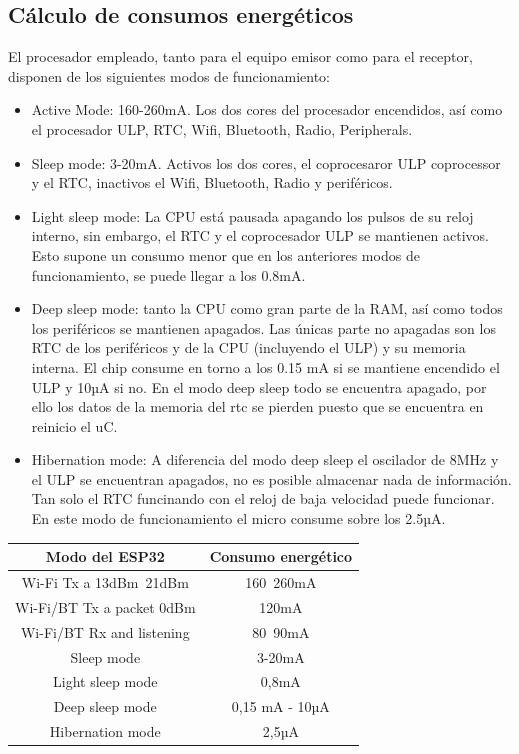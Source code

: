 \documentclass[paper=a4, fontsize=11pt,twoside]{scrartcl}	%
\begin{document}
    \subsection{Cálculo de consumos energéticos}
            El procesador empleado, tanto para el equipo emisor como para el receptor, disponen de los siguientes modos de funcionamiento:
            \begin{itemize}
                \item  Active Mode: 160-260mA. Los dos cores del procesador encendidos, así como el procesador ULP,
                RTC, Wifi, Bluetooth, Radio, Peripherals.
                \item  Sleep mode: 3-20mA. Activos los dos cores, el coprocesaror ULP coprocessor y el RTC, inactivos el 
                Wifi, Bluetooth, Radio y periféricos.
                \item  Light sleep mode: La CPU está pausada apagando los pulsos de su reloj interno, sin embargo, el RTC
                y el coprocesador ULP se mantienen activos. Esto supone un consumo menor que en los anteriores modos de funcionamiento,
                se puede llegar a los 0.8mA.
                \item Deep sleep mode: tanto la CPU como gran parte de la RAM, así como todos los periféricos se mantienen 
                apagados. Las únicas parte no apagadas son los RTC de los periféricos y de la CPU (incluyendo el ULP) y su
                memoria interna. El chip consume en torno a los 0.15 mA si se mantiene encendido el ULP y  10µA si no.
                En el modo deep sleep todo se encuentra apagado, por ello los datos de la memoria del rtc se pierden
                puesto que se encuentra en reinicio el uC.
                \item Hibernation mode: A diferencia del modo deep sleep el oscilador de 8MHz y el ULP se encuentran apagados,
                no es posible almacenar nada de información. Tan solo el RTC funcinando con el reloj de baja velocidad puede funcionar.
                En este modo de funcionamiento el micro consume sobre los 2.5µA.
            \end{itemize}
            \begin{center}
                \begin{tabular}{||c || c ||} 
                \hline
                Modo del ESP32  & Consumo energético  \\ [0.5ex] 
                \hline
                Wi-Fi Tx a 13dBm~21dBm & 160~260mA  \\ 
                Wi-Fi/BT Tx  a packet 0dBm	 & 120mA  \\
                Wi-Fi/BT Rx and listening & 80~90mA  \\
                Sleep mode &  3-20mA   \\
                Light sleep mode &0,8mA  \\
                Deep sleep mode &   0,15 mA - 10µA  \\
                Hibernation mode & 2,5µA  \\
                \hline
                \end{tabular}
            \end{center}
\end{document}
